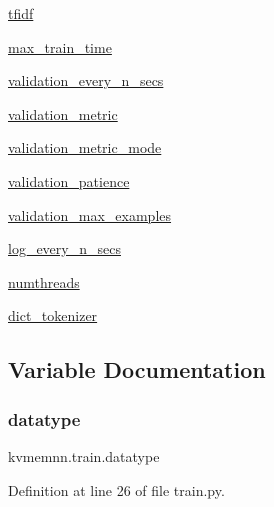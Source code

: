 \begin{DoxyCompactItemize}
\hyperlink{namespacekvmemnn_1_1train_a2c7299b84bf75444cf60d2b443b702d0}{tfidf}
\item 
\hyperlink{namespacekvmemnn_1_1train_aa84f2c4c3f35ef5c480f8ed3e624810e}{max\+\_\+train\+\_\+time}
\item 
\hyperlink{namespacekvmemnn_1_1train_af2418cf1d9464fdd65120d87197b2d6e}{validation\+\_\+every\+\_\+n\+\_\+secs}
\item 
\hyperlink{namespacekvmemnn_1_1train_a5028d0e27c4d754e1ac984c7e7cb38ac}{validation\+\_\+metric}
\item 
\hyperlink{namespacekvmemnn_1_1train_af389be1829c1f2195335c6c3e2dc2f9f}{validation\+\_\+metric\+\_\+mode}
\item 
\hyperlink{namespacekvmemnn_1_1train_a4bd19aecad4623576f79948e32937e5c}{validation\+\_\+patience}
\item 
\hyperlink{namespacekvmemnn_1_1train_a646a63480fc3acbd02ee1f0bdde114f6}{validation\+\_\+max\+\_\+examples}
\item 
\hyperlink{namespacekvmemnn_1_1train_a331673e8cb8de3d40ff2599caf2cea5a}{log\+\_\+every\+\_\+n\+\_\+secs}
\item 
\hyperlink{namespacekvmemnn_1_1train_abdc5e71f35132f2f4a0f83704827fa00}{numthreads}
\item 
\hyperlink{namespacekvmemnn_1_1train_a3bd0180bed95becb58cb03e4fafe6a5f}{dict\+\_\+tokenizer}
\end{DoxyCompactItemize}


\subsection{Variable Documentation}
\mbox{\label{namespacekvmemnn_1_1train_a11027f4fb15005cd3f2470d81d7d093f}} 
\subsubsection{\texorpdfstring{datatype}{datatype}}
{\footnotesize\ttfamily kvmemnn.\+train.\+datatype}



Definition at line 26 of file train.\+py.

\mbox{\label{namespacekvmemnn_1_1train_ab09dbdf5a90c6dd383946655b1a73558}} 

